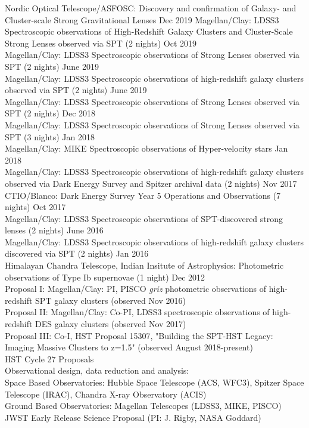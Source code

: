 \documentclass[margin]{res}
\begin{document}
\begin{resume}
Nordic Optical Telescope/ASFOSC: Discovery and confirmation of Galaxy- and Cluster-scale Strong Gravitational Lenses \hfill Dec 2019
Magellan/Clay: LDSS3 Spectroscopic observations of High-Redshift Galaxy Clusters and Cluster-Scale Strong Lenses observed via SPT (2 nights) \hfill Oct 2019\\
Magellan/Clay: LDSS3 Spectroscopic observations of Strong Lenses observed via SPT (2 nights) \hfill June 2019\\
Magellan/Clay: LDSS3 Spectroscopic observations of high-redshift galaxy clusters observed via SPT (2 nights) \hfill June 2019\\
Magellan/Clay: LDSS3 Spectroscopic observations of Strong Lenses observed via SPT (2 nights) \hfill Dec 2018\\
Magellan/Clay: LDSS3 Spectroscopic observations of Strong Lenses observed via SPT (3 nights) \hfill Jan 2018\\
Magellan/Clay: MIKE Spectroscopic observations of Hyper-velocity stars \hfill Jan 2018\\
Magellan/Clay: LDSS3 Spectroscopic observations of high-redshift galaxy clusters observed via Dark Energy Survey and Spitzer archival data (2 nights) \hfill Nov 2017\\
CTIO/Blanco: Dark Energy Survey Year 5 Operations and Observations (7 nights) \hfill Oct 2017\\
Magellan/Clay: LDSS3 Spectroscopic observations of SPT-discovered strong lenses (2 nights) \hfill June 2016\\
Magellan/Clay: LDSS3 Spectroscopic observations of high-redshift galaxy clusters discovered via SPT (2 nights) \hfill Jan 2016\\
Himalayan Chandra Telescope, Indian Insitute of Astrophysics: Photometric observations of Type Ib supernovae (1 night) \hfill Dec 2012\\

Proposal I: Magellan/Clay: PI, PISCO \textit{griz} photometric observations of high-redshift SPT galaxy clusters (observed Nov 2016)\\
Proposal II: Magellan/Clay: Co-PI, LDSS3 spectroscopic observations of high-redshift DES galaxy clusters (observed Nov 2017)\\
Proposal III: Co-I, HST Proposal 15307, "Building the SPT-HST Legacy: Imaging Massive Clusters to z=1.5" (observed August 2018-present)\\
HST Cycle 27 Proposals\\

Observational design, data reduction and analysis:\\
Space Based Observatories: Hubble Space Telescope (ACS, WFC3), Spitzer Space Telescope (IRAC), Chandra X-ray Observatory (ACIS)\\
Ground Based Observatories: Magellan Telescopes (LDSS3, MIKE, PISCO)\\
JWST Early Release Science Proposal (PI: J. Rigby, NASA Goddard)


\end{resume}
\end{document}
